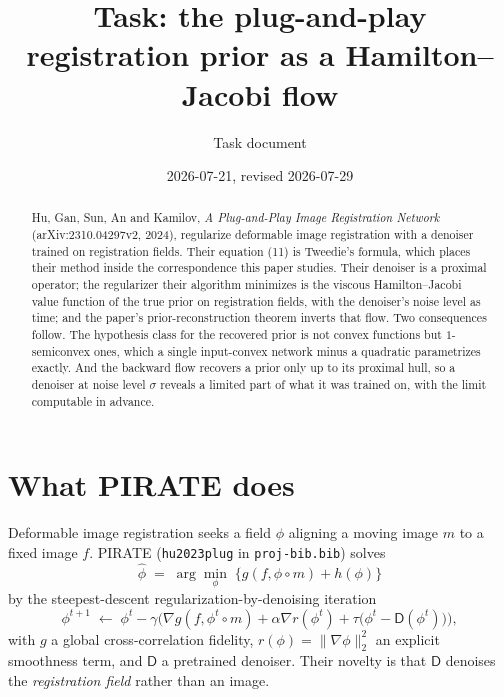 \documentclass[11pt]{article}
\title{Task: the plug-and-play registration prior as a Hamilton--Jacobi flow}
\author{Task document}
\date{2026-07-21, revised 2026-07-29}
\theoremstyle{definition}
\newcommand{\D}{\mathsf{D}}
\newcommand{\code}[1]{\texttt{#1}}
\begin{document}
\maketitle

\begin{abstract}
Hu, Gan, Sun, An and Kamilov, \emph{A Plug-and-Play Image Registration Network} (arXiv:\allowbreak 2310.04297v2, 2024), regularize deformable image registration with a denoiser trained on registration fields. Their equation (11) is Tweedie's formula, which places their method inside the correspondence this paper studies. Their denoiser is a proximal operator; the regularizer their algorithm minimizes is the viscous Hamilton--Jacobi value function of the true prior on registration fields, with the denoiser's noise level as time; and the paper's prior-reconstruction theorem inverts that flow. Two consequences follow. The hypothesis class for the recovered prior is not convex functions but $1$-semiconvex ones, which a single input-convex network minus a quadratic parametrizes exactly. And the backward flow recovers a prior only up to its proximal hull, so a denoiser at noise level $\sigma$ reveals a limited part of what it was trained on, with the limit computable in advance.
\end{abstract}

\tableofcontents

\section{What PIRATE does}
\label{sec:pirate}

Deformable image registration seeks a field $\phi$ aligning a moving image $m$ to a fixed image $f$. PIRATE (\code{hu2023plug} in \code{proj-bib.bib}) solves
\begin{equation}
\label{eq:pirate_obj}
\hat\phi \;=\; \arg\min_\phi\; \big\{ g(f, \phi \circ m) + h(\phi) \big\}
\end{equation}
by the steepest-descent regularization-by-denoising iteration
\begin{equation}
\label{eq:pirate_iter}
\phi^{t+1} \;\leftarrow\; \phi^{t} - \gamma\Big( \nabla g(f,\phi^t\circ m) + \alpha \nabla r(\phi^t) + \tau\big(\phi^t - \D(\phi^t)\big) \Big),
\end{equation}
with $g$ a global cross-correlation fidelity, $r(\phi) = \|\nabla\phi\|_2^2$ an explicit smoothness term, and $\D$ a pretrained denoiser. Their novelty is that $\D$ denoises the \emph{registration field} rather than an image.
\end{document}
